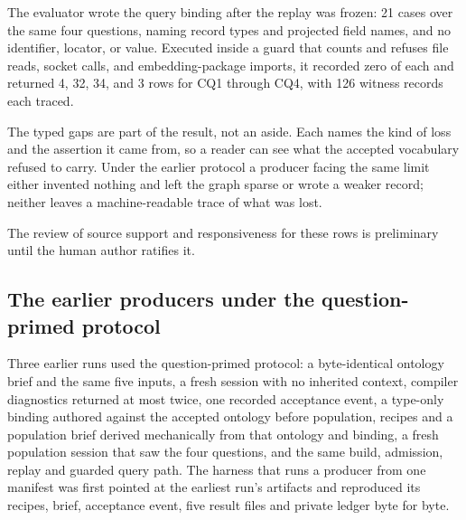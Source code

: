 \documentclass[10pt]{article}
\begin{document}
The evaluator wrote the query binding after the replay was frozen: 21 cases over the same four questions, naming record types and projected field names, and no identifier, locator, or value. Executed inside a guard that counts and refuses file reads, socket calls, and embedding-package imports, it recorded zero of each and returned 4, 32, 34, and 3 rows for CQ1 through CQ4, with 126 witness records each traced.

The typed gaps are part of the result, not an aside. Each names the kind of loss and the assertion it came from, so a reader can see what the accepted vocabulary refused to carry. Under the earlier protocol a producer facing the same limit either invented nothing and left the graph sparse or wrote a weaker record; neither leaves a machine-readable trace of what was lost.

The review of source support and responsiveness for these rows is preliminary until the human author ratifies it.

\subsection{The earlier producers under the question-primed protocol}
\label{sec:earlier}

Three earlier runs used the question-primed protocol: a byte-identical ontology brief and the same five inputs, a fresh session with no inherited context, compiler diagnostics returned at most twice, one recorded acceptance event, a type-only binding authored against the accepted ontology before population, recipes and a population brief derived mechanically from that ontology and binding, a fresh population session that saw the four questions, and the same build, admission, replay and guarded query path. The harness that runs a producer from one manifest was first pointed at the earliest run's artifacts and reproduced its recipes, brief, acceptance event, five result files and private ledger byte for byte.
\end{document}
